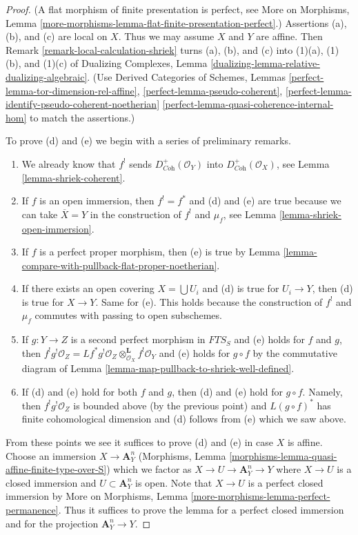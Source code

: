 \begin{proof}
(A flat morphism of finite presentation is perfect, see
More on Morphisms, Lemma
\ref{more-morphisms-lemma-flat-finite-presentation-perfect}.)
Assertions (a), (b), and (c) are local on $X$.
Thus we may assume $X$ and $Y$ are affine.
Then Remark \ref{remark-local-calculation-shriek}
turns (a), (b), and (c) into (1)(a), (1)(b), and (1)(c) of
Dualizing Complexes, Lemma \ref{dualizing-lemma-relative-dualizing-algebraic}.
(Use Derived Categories of Schemes, Lemmas
\ref{perfect-lemma-tor-dimension-rel-affine},
\ref{perfect-lemma-pseudo-coherent},
\ref{perfect-lemma-identify-pseudo-coherent-noetherian}
\ref{perfect-lemma-quasi-coherence-internal-hom} to match the assertions.)

\medskip\noindent
To prove (d) and (e) we begin with a series of preliminary remarks.
\begin{enumerate}
\item We already know that $f^!$ sends $D_{\textit{Coh}}^+(\mathcal{O}_Y)$
into $D_{\textit{Coh}}^+(\mathcal{O}_X)$, see
Lemma \ref{lemma-shriek-coherent}.
\item If $f$ is an open immersion, then $f^! = f^*$ and (d) and (e)
are true because we can take $\overline{X} = Y$ in the construction
of $f^!$ and $\mu_f$, see Lemma \ref{lemma-shriek-open-immersion}.
\item If $f$ is a perfect proper morphism, then (e) is true by
Lemma \ref{lemma-compare-with-pullback-flat-proper-noetherian}.
\item If there exists an open covering $X = \bigcup U_i$ and (d) is
true for $U_i \to Y$, then (d) is true for $X \to Y$. Same for (e).
This holds because the construction of $f^!$ and $\mu_f$ commutes
with passing to open subschemes.
\item If $g : Y \to Z$ is a second perfect morphism in $\textit{FTS}_S$
and (e) holds for $f$ and $g$, then
$f^!g^!\mathcal{O}_Z =
Lf^*g^!\mathcal{O}_Z \otimes_{\mathcal{O}_X}^\mathbf{L} f^!\mathcal{O}_Y$
and (e) holds for $g \circ f$ by the commutative diagram
of Lemma \ref{lemma-map-pullback-to-shriek-well-defined}.
\item If (d) and (e) hold for both $f$ and $g$, then
(d) and (e) hold for $g \circ f$. Namely, then $f^!g^!\mathcal{O}_Z$
is bounded above (by the previous point) and $L(g \circ f)^*$ has finite
cohomological dimension and (d) follows from (e) which we saw above.
\end{enumerate}
From these points we see it suffices to prove (d) and (e) in case $X$ is
affine. Choose an immersion $X \to \mathbf{A}^n_Y$
(Morphisms, Lemma \ref{morphisms-lemma-quasi-affine-finite-type-over-S})
which we factor as $X \to U \to \mathbf{A}^n_Y \to Y$ where $X \to U$
is a closed immersion and $U \subset \mathbf{A}^n_Y$ is open.
Note that $X \to U$ is a perfect closed immersion by
More on Morphisms, Lemma \ref{more-morphisms-lemma-perfect-permanence}.
Thus it suffices to prove the lemma for a perfect closed immersion
and for the projection $\mathbf{A}^n_Y \to Y$.


\end{proof}
